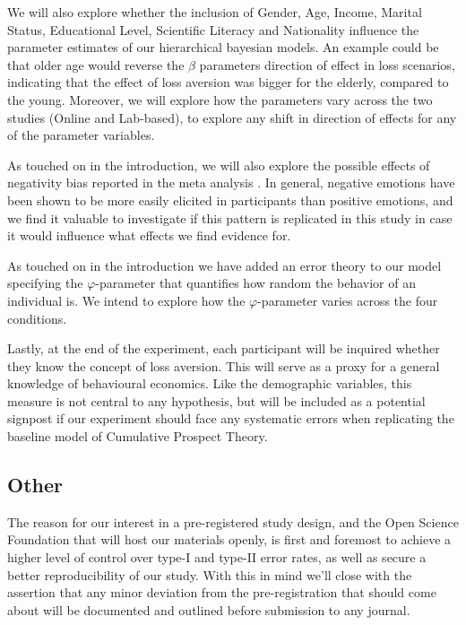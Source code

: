 \documentclass{article}
\begin{document}
We will also explore whether the inclusion of Gender, Age, Income, Marital Status, Educational Level, Scientific Literacy and Nationality influence the parameter estimates of our hierarchical bayesian models. An example could be that older age would reverse the $\beta$ parameters direction of effect in loss scenarios, indicating that the effect of loss aversion was bigger for the elderly, compared to the young.
Moreover, we will explore how the parameters vary across the two studies (Online and Lab-based), to explore any shift in direction of effects for any of the parameter variables.

As touched on in the introduction, we will also explore the possible effects of negativity bias reported in the meta analysis \cite{joseph2020pbb}. In general, negative emotions have been shown to be more easily elicited in participants than positive emotions, and we find it valuable to investigate if this pattern is replicated in this study in case it would influence what effects we find evidence for.

As touched on in the introduction we have added an error theory to our model specifying the $\varphi$-parameter that quantifies how random the behavior of an individual is. We intend to explore how the $\varphi$-parameter varies across the four conditions.

Lastly, at the end of the experiment, each participant will be inquired whether they know the concept of loss aversion. This will serve as a proxy for a general knowledge of behavioural economics. Like the demographic variables, this measure is not central to any hypothesis, but will be included as a potential signpost if our experiment should face any systematic errors when replicating the baseline model of Cumulative Prospect Theory. 

\subsection{Other}
The reason for our interest in a pre-registered study design, and the Open Science Foundation that will host our materials openly, is first and foremost to achieve a higher level of control over type-I and type-II error rates, as well as secure a better reproducibility of our study. With this in mind we’ll close with the assertion that any minor deviation from the pre-registration that should come about will be documented and outlined before submission to any journal.

    

    
\end{document}
